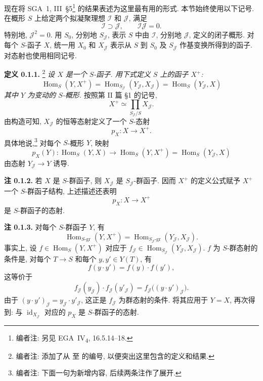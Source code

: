 现在将 SGA~1, III~\S5\footnote{编者注: 另见
EGA~IV\textsubscript{4}, 16.5.14--18.} 的结果表述为这里最有用的形式.
本节始终使用以下记号. 在概形 \(S\) 上给定两个拟凝聚理想
\(\mathscr I\) 和 \(\mathscr J\), 满足
\[
 \mathscr I\supset\mathscr J,
 \qquad
 \mathscr I\mathscr J=0.
\]
特别地, \(\mathscr J^2=0\). 用 \(S_0\), 分别地
\(S_{\mathscr J}\), 表示 \(S\) 中由 \(\mathscr I\), 分别地
\(\mathscr J\), 定义的闭子概形. 对每个 \(S\)-函子 \(X\),
统一用 \(X_0\) 和 \(X_{\mathscr J}\) 表示从 \(S\) 到 \(S_0\)
及 \(S_{\mathscr J}\) 作基变换所得到的函子. 对态射也使用相同记号.

\medskip
\noindent{}\textbf{定义 0.1.1.}
\footnote{编者注: 添加了从 
至  的编号,
以便突出这里包含的定义和结果.}
\textit{设 \(X\) 是一个 \(S\)-函子. 用下式定义 \(S\) 上的函子 \(X^+\):}
\[
 \operatorname{Hom}_S(Y,X^+)
 =\operatorname{Hom}_{S_{\mathscr J}}
    (Y_{\mathscr J},X_{\mathscr J})
 =\operatorname{Hom}_S(Y_{\mathscr J},X)
\]
\textit{其中 \(Y\) 为变动的 \(S\)-概形.} 按照第 II 篇 \S1 的记号,
\[
 X^+\simeq\prod_{S_{\mathscr J}/S}X_{\mathscr J}.
\]
由构造可知, \(X_{\mathscr J}\) 的恒等态射定义了一个
\(S\)-态射
\[
 p_X:X\longrightarrow X^+.
\]
具体地说,\footnote{编者注: 下面一句为新增内容, 后续两条注作了展开.}
对每个 \(S\)-概形 \(Y\), 映射
\[
 p_X(Y):
 \operatorname{Hom}_S(Y,X)\longrightarrow
 \operatorname{Hom}_S(Y,X^+)
 =\operatorname{Hom}_S(Y_{\mathscr J},X)
\]
由态射 \(Y_{\mathscr J}\to Y\) 诱导.

\medskip
\noindent{}\textbf{注 0.1.2.}
若 \(X\) 是 \(S\)-群函子, 则 \(X_{\mathscr J}\) 是
\(S_{\mathscr J}\)-群函子. 因而 \(X^+\) 的定义公式赋予
\(X^+\) 一个 \(S\)-群函子结构, 上述描述还表明
\[
 p_X:X\longrightarrow X^+
\]
是 \(S\)-群函子的态射.

\medskip
\noindent{}\textbf{注 0.1.3.}
对每个 \(S\)-群函子 \(Y\), 有
\[
 \operatorname{Hom}_{S\text{-}\mathrm{gr}}(Y,X^+)
 =
 \operatorname{Hom}_{S_{\mathscr J}\text{-}\mathrm{gr}}
   (Y_{\mathscr J},X_{\mathscr J}).
\]
事实上, 设 \(f\in\operatorname{Hom}_S(Y,X^+)\) 对应于
\(f_{\mathscr J}\in
\operatorname{Hom}_{S_{\mathscr J}}
(Y_{\mathscr J},X_{\mathscr J})\). \(f\) 为 \(S\)-群态射的条件是,
对每个 \(T\to S\) 和每个 \(y,y'\in Y(T)\), 有
\[
 f(y\cdot y')=f(y)\cdot f(y'),
\]
这等价于
\[
 f_{\mathscr J}(y_{\mathscr J})
 \cdot f_{\mathscr J}(y'_{\mathscr J})
 =f_{\mathscr J}\bigl((y\cdot y')_{\mathscr J}\bigr).
\]
由于 \((y\cdot y')_{\mathscr J}
=y_{\mathscr J}\cdot y'_{\mathscr J}\), 这正是
\(f_{\mathscr J}\) 为群态射的条件. 将其应用于 \(Y=X\),
再次得到: 与 \(\operatorname{id}_{X_{\mathscr J}}\) 对应的 \(p_X\)
是 \(S\)-群函子的态射.

